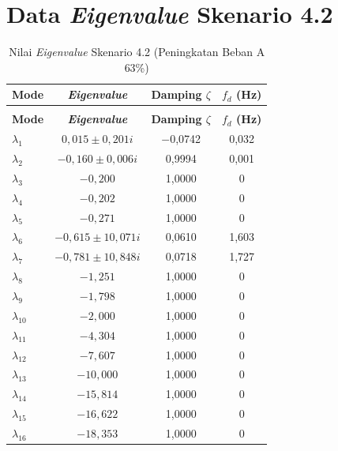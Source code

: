 \section{Data \textit{Eigenvalue} Skenario 4.2}
\begingroup
\fontsize{11}{13.2}\selectfont
\setlength{\tabcolsep}{7pt}
\begin{longtable}{>{\centering\arraybackslash}m{1.5cm} c c c} \caption[]{Nilai
	\textit{Eigenvalue} Skenario 4.2 (Peningkatan Beban A 63\%)}
	\label{tab:eigenvalue_sk42_lampiran} \\
	\toprule
	\textbf{Mode} & \textbf{\textit{Eigenvalue}} & \textbf{Damping $\zeta$} &
	\textbf{$f_d$ (Hz)} \\
	\midrule
	\endfirsthead
	\multicolumn{4}{l}{\textit{(lanjutan)}} \\
	\toprule
	\textbf{Mode} & \textbf{\textit{Eigenvalue}} & \textbf{Damping $\zeta$} &
	\textbf{$f_d$ (Hz)} \\
	\midrule
	\endhead
	\bottomrule
	\endfoot
	$\lambda_1$  & $0{,}015 \pm 0{,}201i$           & $-$0,0742 & 0,032 \\
	$\lambda_2$  & $-0{,}160 \pm 0{,}006i$          & 0,9994 & 0,001 \\
	$\lambda_3$  & $-0{,}200$                        & 1,0000 & 0 \\
	$\lambda_4$  & $-0{,}202$                        & 1,0000 & 0 \\
	$\lambda_5$  & $-0{,}271$                        & 1,0000 & 0 \\
	$\lambda_6$  & $-0{,}615 \pm 10{,}071i$          & 0,0610 & 1,603 \\
	$\lambda_7$  & $-0{,}781 \pm 10{,}848i$          & 0,0718 & 1,727 \\
	$\lambda_8$  & $-1{,}251$                        & 1,0000 & 0 \\
	$\lambda_9$  & $-1{,}798$                        & 1,0000 & 0 \\
	$\lambda_{10}$ & $-2{,}000$                      & 1,0000 & 0 \\
	$\lambda_{11}$ & $-4{,}304$                      & 1,0000 & 0 \\
	$\lambda_{12}$ & $-7{,}607$                      & 1,0000 & 0 \\
	$\lambda_{13}$ & $-10{,}000$                     & 1,0000 & 0 \\
	$\lambda_{14}$ & $-15{,}814$                     & 1,0000 & 0 \\
	$\lambda_{15}$ & $-16{,}622$                     & 1,0000 & 0 \\
	$\lambda_{16}$ & $-18{,}353$                     & 1,0000 & 0 \\

\end{longtable}
